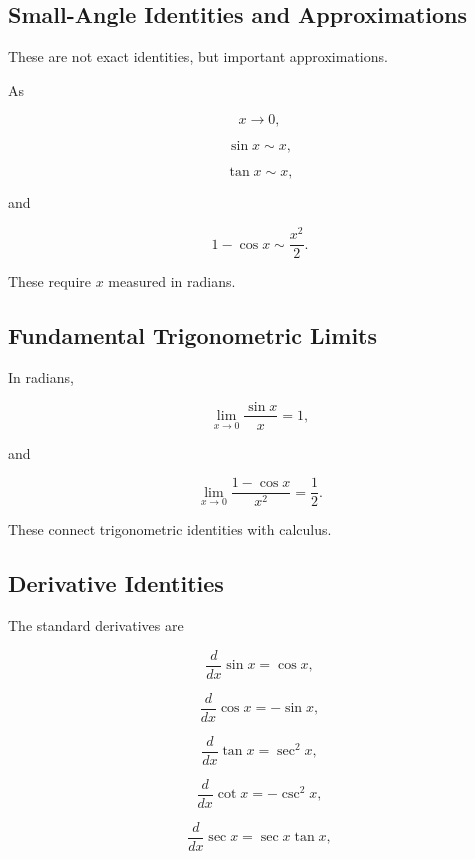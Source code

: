 \subsection{Small-Angle Identities and Approximations}
\label{subsec:small-angle-reference}

These are not exact identities, but important approximations.

As

\[
x\to0,
\]

\[
\boxed{
\sin x
\sim
x,
}
\]

\[
\boxed{
\tan x
\sim
x,
}
\]

and

\[
\boxed{
1-\cos x
\sim
\frac{x^2}{2}.
}
\]

These require \(x\) measured in radians.

\subsection{Fundamental Trigonometric Limits}
\label{subsec:fundamental-trig-limits-reference}

In radians,

\[
\boxed{
\lim_{x\to0}
\frac{\sin x}{x}
=
1,
}
\]

and

\[
\boxed{
\lim_{x\to0}
\frac{1-\cos x}{x^2}
=
\frac12.
}
\]

These connect trigonometric identities with calculus.

\subsection{Derivative Identities}
\label{subsec:trig-derivative-reference}

The standard derivatives are

\[
\boxed{
\frac{d}{dx}\sin x
=
\cos x,
}
\]

\[
\boxed{
\frac{d}{dx}\cos x
=
-\sin x,
}
\]

\[
\boxed{
\frac{d}{dx}\tan x
=
\sec^2x,
}
\]

\[
\boxed{
\frac{d}{dx}\cot x
=
-\csc^2x,
}
\]

\[
\boxed{
\frac{d}{dx}\sec x
=
\sec x\tan x,
}
\]

